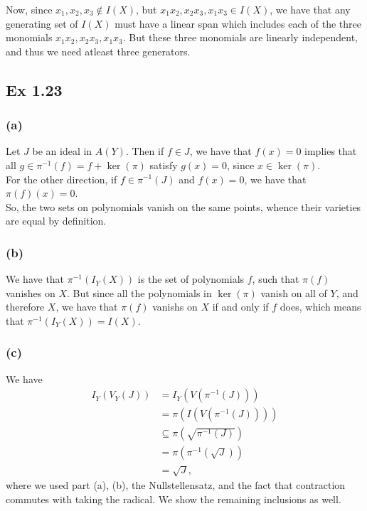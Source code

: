 \documentclass{article}
\theoremstyle{definition}
\begin{document}
Now, since $x_1, x_2, x_3 \not \in I(X)$, but $x_1x_2, x_2x_3, x_1x_3 \in
I(X)$, we have that any generating set of $I(X)$ must have a linear span which
includes each of the three monomials $x_1x_2, x_2x_3, x_1x_3$. But these three
monomials are linearly independent, and thus we need atleast three generators.

\subsection*{Ex 1.23}
\subsubsection*{(a)}

Let $J$ be an ideal in $A(Y)$. Then if $f \in J$, we have that $f(x) = 0$
implies that all $g \in \pi^{-1}(f) = f + \ker(\pi)$ satisfy $g(x) = 0$, since
$x \in \ker(\pi)$. \\

For the other direction, if $f \in \pi^{-1}(J)$ and $f(x) = 0$, we have that 
$\pi(f)(x) = 0$. \\

So, the two sets on polynomials vanish on the same points, whence their
varieties are equal by definition. \\

\subsubsection*{(b)}

We have that $\pi^{-1}(I_Y(X))$ is the set of polynomials $f$, such that
$\pi(f)$ vanishes on $X$. But since all the polynomials in $\ker(\pi)$ vanish
on all of $Y$, and therefore $X$, we have that $\pi(f)$ vanishs on $X$ if and
only if $f$ does, which means that $\pi^{-1}(I_Y(X)) = I(X)$.

\subsubsection*{(c)}

We have 
\begin{align*}
	I_{Y}(V_{Y}(J))
	&=
	I_{Y}(V(\pi^{-1}(J))) \\
	&=
	\pi(I(V(\pi^{-1}(J)))) \\
	&\subseteq
	\pi(\sqrt{\pi^{-1}(J)}) \\
	&=
	\pi(\pi^{-1}(\sqrt{J})) \\
	&=
	\sqrt{J},
\end{align*}
where we used part (a), (b), the Nullstellensatz, and the fact that contraction
commutes with taking the radical. We show the remaining inclusions as well. \\
\end{document}
